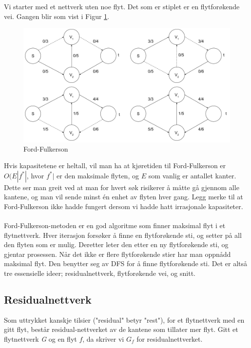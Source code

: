 \begin{boxed}
Vi starter med et nettverk uten noe flyt. Det som er stiplet er en flytforøkende vei. Gangen blir som vist i Figur \ref{fig:ford-fulkerson}.

\begin{figure}[H]
\includegraphics[scale=0.45]{images/ford-fulkerson}
\centering %
\caption{Ford-Fulkerson}
\label{fig:ford-fulkerson}
\end{figure}
\end{boxed}

\noindent Hvis kapasitetene er heltall, vil man ha at kjøretiden til Ford-Fulkerson er $O(E|f^*|$, hvor $f^*|$ er den maksimale flyten, og $E$ som vanlig er antallet kanter. Dette ser man greit ved at man for hvert søk risikerer å måtte gå gjennom alle kantene, og man vil sende minst én enhet av flyten hver gang. Legg merke til at Ford-Fulkerson ikke hadde fungert dersom vi hadde hatt irrasjonale kapasiteter.  
\\\\
Ford-Fulkerson-metoden er en god algoritme som finner maksimal flyt i et flytnettverk. Hver iterasjon forsøker å finne en flytforøkende sti, og setter på all den flyten som er mulig. Deretter leter den etter en ny flytforøkende sti, og gjentar prosessen. Når det ikke er flere flytforøkende stier har man oppnådd maksimal flyt. Den benytter seg av DFS for å finne flytforøkende sti. Det er altså tre essensielle ideer; residualnettverk, flytforøkende vei, og snitt.\\

\subsection{Residualnettverk}
Som uttrykket kanskje tilsier ("residual" betyr "rest"), for et flytnettverk med en gitt flyt, består residual-nettverket av de kantene som tillater mer flyt. Gitt et flytnettverk \textit{G} og en flyt $f$, da skriver vi $G_f$ for residualnettverket.

